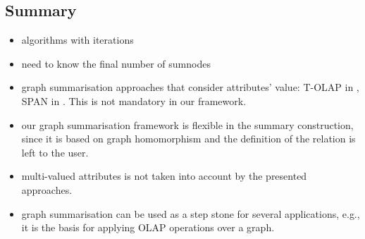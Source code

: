 \subsection{Summary}

\begin{itemize}
\item algorithms with iterations
\item need to know the final number of sumnodes
\item graph summarisation approaches that consider attributes' value: T-OLAP in \cite{chen:icdm:2008}, SPAN in \cite{tian:sigmod:2008}. This is not mandatory in our framework.
\item our graph summarisation framework is flexible in the summary construction, since it is based on graph homomorphism and the definition of the relation is left to the user.
\item multi-valued attributes is not taken into account by the presented approaches.
\item graph summarisation can be used as a step stone for several applications, e.g., it is the basis for applying OLAP operations over a graph.
\end{itemize}
